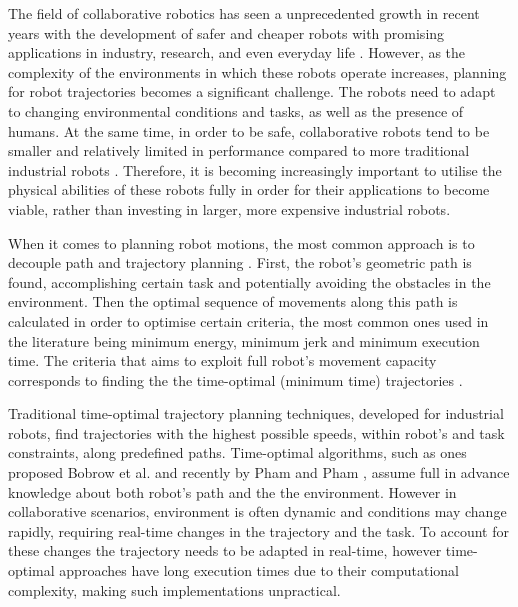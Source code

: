 The field of collaborative robotics has seen a unprecedented growth in recent years with the development of safer and cheaper robots with promising applications in industry, research, and even everyday life \cite{ajoudani2018progress}. However, as the complexity of the environments in which these robots operate increases, planning for robot trajectories becomes a significant challenge.  The robots need to adapt to changing environmental conditions and tasks, as well as the presence of humans. 
At the same time, in order to be safe, collaborative robots tend to be smaller and relatively limited in performance compared to more traditional industrial robots \cite{smu}. Therefore, it is becoming increasingly important to utilise the physical abilities of these robots fully in order for their applications to become viable, rather than investing in larger, more expensive industrial robots. 


When it comes to planning robot motions, the most common approach is to decouple path and trajectory planning \cite{Pardo1996}. First, the robot's geometric path is found, accomplishing certain task and potentially avoiding the obstacles in the environment. Then the optimal sequence of movements along this path is calculated in order to optimise certain criteria, the most common ones used in the literature being minimum energy, minimum jerk and minimum execution time. The criteria that aims to exploit full robot's movement capacity corresponds to finding the the time-optimal (minimum time) trajectories \cite{gasparetto2012trajectory}. 

Traditional time-optimal trajectory planning techniques, developed for industrial robots, find trajectories with the highest possible speeds, within robot's and task constraints, along predefined paths. Time-optimal algorithms, such as ones proposed Bobrow et al. \cite{bobrow1985time} and recently by Pham and Pham \cite{Pham2018}, assume full in advance knowledge about both robot's path and the the environment. However in collaborative scenarios, environment is often dynamic and conditions may change rapidly, requiring real-time changes in the trajectory and the task. To account for these changes the trajectory needs to be adapted in real-time, however time-optimal approaches have long execution times due to their computational complexity, making such implementations unpractical. 


